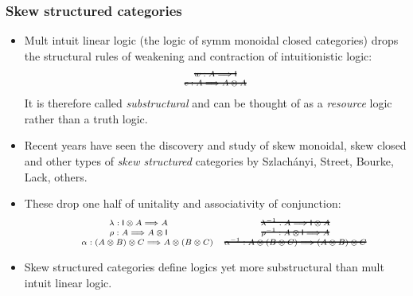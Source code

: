 \documentclass[10pt,t]{beamer}
\newcommand{\mathsout}[1]%
{\bgroup\mathchoice
  {\sbox0{$\displaystyle{#1}$}%
    \usebox0\hspace{-\wd0}%
    \rule[0.5\ht0-0.5\dp0-.5pt]{\wd0}{1pt}}%
  {\sbox0{$\textstyle{#1}$}%
    \usebox0\hspace{-\wd0}%
    \rule[0.5\ht0-0.5\dp0-.5pt]{\wd0}{1pt}}%
  {\sbox0{$\scriptstyle{#1}$}%
    \usebox0\hspace{-\wd0}%
    \rule[0.5\ht0-0.5\dp0-.5pt]{\wd0}{1pt}}%
  {\sbox0{$\scriptscriptstyle{#1}$}%
    \usebox0\hspace{-\wd0}%
    \rule[0.5\ht0-0.5\dp0-.5pt]{\wd0}{1pt}}%
\egroup}
\newcommand{\I}{\mathsf{I}}
\newcommand{\ot}{\otimes}
\newcommand{\al}{\alpha}
\newcommand{\lam}{\lambda}
\newcommand{\tto}{\Longrightarrow}
\begin{document}
\begin{frame}

\frametitle{Skew structured categories}

\begin{itemize}

\item Mult intuit linear logic (the logic of symm monoidal closed
  categories) drops the structural rules of weakening and contraction
  of intuitionistic logic:
\[
\scriptsize
\begin{array}{c}
\mathsout{w : A \tto \I}
\\
\mathsout{c : A \tto A \otimes A}
\end{array}
\]
It is therefore called \emph{substructural} and can be thought of as a
\emph{resource} logic rather than a truth logic.

\bigskip

\item Recent years have seen the discovery and study of skew
  monoidal, skew closed and other types of \emph{skew structured}
  categories by Szlach\'anyi, Street, Bourke, Lack, others.

\item These drop one half of unitality and associativity of
  conjunction:
\[
\scriptsize
\begin{array}{cc}
\lam: \I \ot A \tto A 
& 
\mathsout{\lam^{-1} : A \tto \I \otimes A} \\
\rho: A \tto A \ot \I 
& 
\mathsout{\rho^{-1} : A \ot \I \tto A} \\
\qquad
\al : (A \ot B) \ot C \tto A \ot (B \ot C) 
& 
\mathsout{\al^{-1} : A \ot (B \ot C) \tto (A \ot B) \ot C}
\end{array}
\]

\item Skew structured categories define logics yet more substructural
  than mult intuit linear logic.

\end{itemize}

\end{frame}
\end{document}
